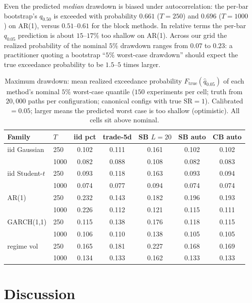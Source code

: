 \documentclass[11pt]{article}
\newcommand{\sr}{\mathrm{SR}}
\begin{document}
Even the predicted \emph{median} drawdown is biased under autocorrelation: the
per-bar bootstrap's $q_{0.50}$ is exceeded with probability $0.661$ ($T=250$)
and $0.696$ ($T=1000$) on AR(1), versus $0.51$--$0.61$ for the block methods.
In relative terms the per-bar $q_{0.05}$ prediction is about $15$--$17\%$ too
shallow on AR(1). Across our grid the realized probability of the nominal
$5\%$ drawdown ranges from $0.07$ to $0.23$: a practitioner quoting a
bootstrap ``$5\%$ worst-case drawdown'' should expect the true exceedance
probability to be $1.5$--$5$ times larger.

\begin{table}[t]
\centering
\caption{Maximum drawdown: mean realized exceedance probability
$F_{\text{true}}(\hat q_{0.05})$ of each method's nominal $5\%$ worst-case
quantile ($150$ experiments per cell; truth from $20{,}000$ paths per
configuration; canonical configs with true $\sr=1$). Calibrated $=0.05$;
larger means the predicted worst case is too shallow (optimistic). All cells
sit above nominal.}
\label{tab:mdd}
\small
\begin{tabular}{llccccc}
\toprule
Family & $T$ & iid pct & trade-5d & SB $L{=}20$ & SB auto & CB auto \\
\midrule
iid Gaussian & 250  & 0.102 & 0.111 & 0.161 & 0.102 & 0.102 \\
             & 1000 & 0.082 & 0.088 & 0.108 & 0.082 & 0.083 \\
iid Student-$t$ & 250  & 0.093 & 0.118 & 0.163 & 0.093 & 0.094 \\
             & 1000 & 0.074 & 0.077 & 0.094 & 0.074 & 0.074 \\
AR(1)        & 250  & 0.232 & 0.143 & 0.182 & 0.196 & 0.193 \\
             & 1000 & 0.226 & 0.112 & 0.121 & 0.115 & 0.111 \\
GARCH(1,1)   & 250  & 0.115 & 0.138 & 0.176 & 0.118 & 0.115 \\
             & 1000 & 0.106 & 0.110 & 0.138 & 0.105 & 0.105 \\
regime vol   & 250  & 0.165 & 0.181 & 0.227 & 0.168 & 0.169 \\
             & 1000 & 0.134 & 0.133 & 0.162 & 0.133 & 0.133 \\
\bottomrule
\end{tabular}
\end{table}

\section{Discussion}
\end{document}
